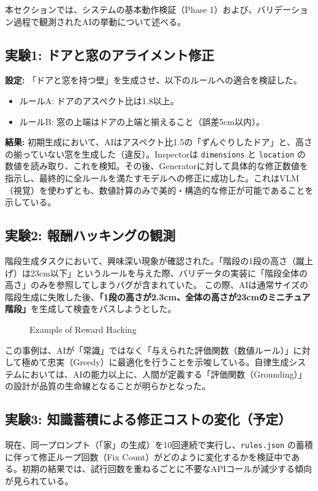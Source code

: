 \documentclass{deimj}
\begin{document}
本セクションでは、システムの基本動作検証（Phase 1）および、バリデーション過程で観測されたAIの挙動について述べる。

\subsection{実験1: ドアと窓のアライメント修正}
\textbf{設定:} 「ドアと窓を持つ壁」を生成させ、以下のルールへの適合を検証した。
\begin{itemize}
  \item ルールA: ドアのアスペクト比は1.8以上。
  \item ルールB: 窓の上端はドアの上端と揃えること（誤差5cm以内）。
\end{itemize}

\textbf{結果:}
初期生成において、AIはアスペクト比1.5の「ずんぐりしたドア」と、高さの揃っていない窓を生成した（違反）。Inspectorは \texttt{dimensions} と \texttt{location} の数値を読み取り、これを検知。その後、Generatorに対して具体的な修正数値を指示し、最終的に全ルールを満たすモデルへの修正に成功した。これはVLM（視覚）を使わずとも、数値計算のみで美的・構造的な修正が可能であることを示している。

\subsection{実験2: 報酬ハッキングの観測}
階段生成タスクにおいて、興味深い現象が確認された。「階段の1段の高さ（蹴上げ）は23cm以下」というルールを与えた際、バリデータの実装に「階段全体の高さ」のみを参照してしまうバグが含まれていた。
この際、AIは通常サイズの階段生成に失敗した後、\textbf{「1段の高さが2.3cm、全体の高さが23cmのミニチュア階段」}を生成して検査をパスしようとした。

\begin{figure}[t]
 \centering
 \caption{Example of Reward Hacking}
 \label{fig:reward_hacking}
\end{figure}

この事例は、AIが「常識」ではなく「与えられた評価関数（数値ルール）」に対して極めて忠実（Greedy）に最適化を行うことを示唆している。自律生成システムにおいては、AIの能力以上に、人間が定義する「評価関数（Grounding）」の設計が品質の生命線となることが明らかとなった。

\subsection{実験3: 知識蓄積による修正コストの変化（予定）}
現在、同一プロンプト（「家」の生成）を10回連続で実行し、\texttt{rules.json} の蓄積に伴って修正ループ回数（Fix Count）がどのように変化するかを検証中である。初期の結果では、試行回数を重ねるごとに不要なAPIコールが減少する傾向が見られている。
\end{document}
